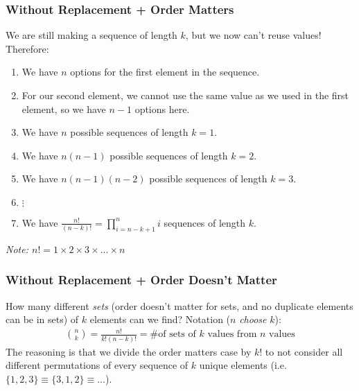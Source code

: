 \documentclass{beamer}
\begin{document}
\begin{frame}
    \frametitle{Without Replacement + Order Matters}
    We are still making a sequence of length $k$, but we now can't reuse values! Therefore:
    \begin{enumerate}
        \item We have $n$ options for the first element in the sequence.
        \item For our second element, we cannot use the same value as we used in the first element, so we have $n-1$ options here.
        \item We have $n$ possible sequences of length $k=1$.
        \item We have $n(n-1)$ possible sequences of length $k=2$.
        \item We have $n(n-1)(n-2)$ possible sequences of length $k=3$.
        \item $\vdots$
        \item We have $\boxed{\frac{n!}{(n-k)!}=\prod_{i=n-k+1}^ni}$ sequences of length $k$.
    \end{enumerate}
    {\it Note: $n!=1\times 2\times 3\times...\times n$}
\end{frame}

\begin{frame}
    \frametitle{Without Replacement + Order Doesn't Matter}
    How many different {\it sets} (order doesn't matter for sets, and no duplicate elements can be in sets) of $k$ elements can we find? Notation ($n$ {\it choose} $k$):
    \begin{align*}
        \boxed{\binom{n}{k}}=\frac{n!}{k!(n-k)!}=\text{\# of sets of $k$ values from $n$ values}
    \end{align*}
    The reasoning is that we divide the order matters case by $k!$ to not consider all different permutations of every sequence of $k$ unique elements (i.e. $\{1,2,3\}\equiv\{3,1,2\}\equiv\dots$).
\end{frame}
\end{document}
